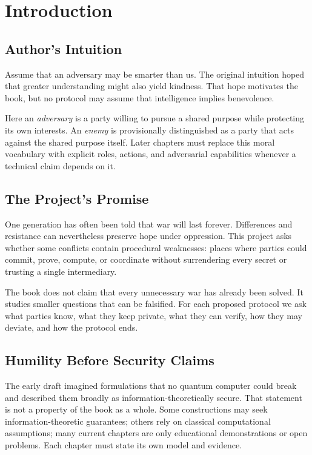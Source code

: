 \chapter{Introduction}
\label{chap:introduction}


\section{Author's Intuition}

Assume that an adversary may be smarter than us. The original intuition hoped
that greater understanding might also yield kindness. That hope motivates the
book, but no protocol may assume that intelligence implies benevolence.

Here an \emph{adversary} is a party willing to pursue a shared purpose while
protecting its own interests. An \emph{enemy} is provisionally distinguished
as a party that acts against the shared purpose itself. Later chapters must
replace this moral vocabulary with explicit roles, actions, and adversarial
capabilities whenever a technical claim depends on it.

\section{The Project's Promise}

One generation has often been told that war will last forever. Differences and
resistance can nevertheless preserve hope under oppression. This project asks
whether some conflicts contain procedural weaknesses: places where parties
could commit, prove, compute, or coordinate without surrendering every secret
or trusting a single intermediary.

The book does not claim that every unnecessary war has already been solved.
It studies smaller questions that can be falsified. For each proposed protocol
we ask what parties know, what they keep private, what they can verify, how
they may deviate, and how the protocol ends.

\section{Humility Before Security Claims}

The early draft imagined formulations that no quantum computer could break and
described them broadly as information-theoretically secure. That statement is
not a property of the book as a whole. Some constructions may seek
information-theoretic guarantees; others rely on classical computational
assumptions; many current chapters are only educational demonstrations or open
problems. Each chapter must state its own model and evidence.

